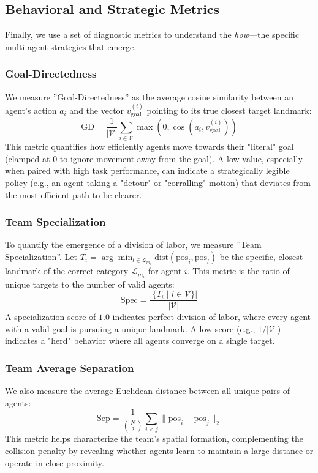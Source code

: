 \documentclass[12pt, a4paper]{report}
\begin{document}
\subsection{Behavioral and Strategic Metrics}
Finally, we use a set of diagnostic metrics to understand the \textit{how}---the specific multi-agent strategies that emerge.

\subsubsection{Goal-Directedness}
We measure ''Goal-Directedness'' as the average cosine similarity between an agent's action $a_i$ and the vector $v_{\text{goal}}^{(i)}$ pointing to its true closest target landmark:
$$ \text{GD} = \frac{1}{|\mathcal{V}|} \sum_{i \in \mathcal{V}} \max\left(0, \cos(a_i, v_{\text{goal}}^{(i)})\right) $$
This metric quantifies how efficiently agents move towards their "literal" goal (clamped at 0 to ignore movement away from the goal). A low value, especially when paired with high task performance, can indicate a strategically legible policy (e.g., an agent taking a "detour" or "corralling" motion) that deviates from the most efficient path to be clearer.

\subsubsection{Team Specialization}
To quantify the emergence of a division of labor, we measure ''Team Specialization''. Let $T_i = \arg\min_{l \in \mathcal{L}_{m_i}} \text{dist}(\text{pos}_i, \text{pos}_l)$ be the specific, closest landmark of the correct category $\mathcal{L}_{m_i}$ for agent $i$. This metric is the ratio of unique targets to the number of valid agents:
$$ \text{Spec} = \frac{|\{T_i \mid i \in \mathcal{V}\}|}{|\mathcal{V}|} $$
A specialization score of $1.0$ indicates perfect division of labor, where every agent with a valid goal is pursuing a unique landmark. A low score (e.g., $1/|\mathcal{V}|$) indicates a "herd" behavior where all agents converge on a single target.

\subsubsection{Team Average Separation}
We also measure the average Euclidean distance between all unique pairs of agents:
$$ \text{Sep} = \frac{1}{\binom{N}{2}} \sum_{i<j} \| \text{pos}_i - \text{pos}_j \|_2 $$
This metric helps characterize the team's spatial formation, complementing the collision penalty by revealing whether agents learn to maintain a large distance or operate in close proximity.
\end{document}
